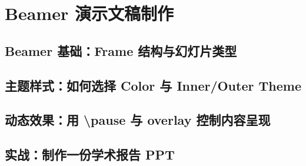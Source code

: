 \chapter{Beamer 演示文稿制作}
\section{Beamer 基础：Frame 结构与幻灯片类型}
\section{主题样式：如何选择 Color 与 Inner/Outer Theme}
\section{动态效果：用 \textbackslash pause 与 overlay 控制内容呈现}
\section{实战：制作一份学术报告 PPT}